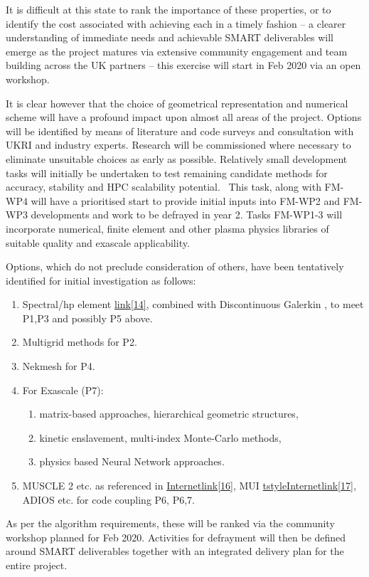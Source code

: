 \bigskip

It is difficult at this state to rank the importance of these properties, or to 
identify the cost associated with
achieving each in a timely fashion -- a clearer understanding of immediate 
needs and achievable SMART deliverables will
emerge as the project matures via extensive community engagement and team 
building across the UK partners -- this
exercise will start in Feb 2020 via an open workshop. 


\bigskip

It is clear however that the choice of geometrical representation and numerical 
scheme will have a profound impact upon
almost all areas of the project. Options will be identified by means of 
literature and code surveys and consultation
with UKRI and industry experts. Research will be commissioned where necessary 
to eliminate unsuitable choices as early
as possible. Relatively small development tasks will initially be undertaken to 
test remaining candidate methods for
accuracy, stability and HPC scalability potential. \ This task, along with 
FM-WP4 will have a prioritised start to
provide initial inputs into FM-WP2 and FM-WP3 developments and work to be 
defrayed in year 2. Tasks FM-WP1-3 will
incorporate numerical, finite element and other plasma physics libraries of 
suitable quality and exascale
applicability.


\bigskip

Options, which do not preclude consideration of others, have been tentatively 
identified for initial investigation as
follows:


\bigskip

\liststyleWWNumix
\begin{enumerate}
\item Spectral/hp {element
}\href{https://en.wikipedia.org/wiki/Spectral_element_method}{\textstyleInternet
link{{[14]}}}{,
combined }with Discontinuous {Galerkin
}\href{https://www.sciencedirect.com/topics/engineering/discontinuous-galerkin}{
\textstyleInternetlink{{[15]}}}{,
to }meet P1,P3 and possibly P5 above.
\item Multigrid methods for P2.
\item Nekmesh for P4.
\item For Exascale (P7):

\begin{enumerate}
\item matrix-based approaches, hierarchical geometric structures,
\item kinetic enslavement, multi-index Monte-Carlo methods,
\item physics based Neural Network approaches.
\end{enumerate}
\item {MUSCLE 2 etc. as referenced in
}\href{https://royalsocietypublishing.org/doi/10.1098/rsta.2018.0144}{\textstyle
Internetlink{{[16]}}}{,
MUI
}\href{https://www.sciencedirect.com/science/article/pii/S0021999115003228}{\tex
tstyleInternetlink{{[17]}}}{,
ADIOS
}\href{https://www.olcf.ornl.gov/center-projects/adios/}{\textstyleInternetlink{
{[18]}}}{
etc. for code }coupling P6, P6,7.
\end{enumerate}

\bigskip

As per the algorithm requirements, these will be ranked via the community 
workshop planned for Feb 2020. Activities for
defrayment will then be defined around SMART deliverables together with an 
integrated delivery plan for the entire
project.

